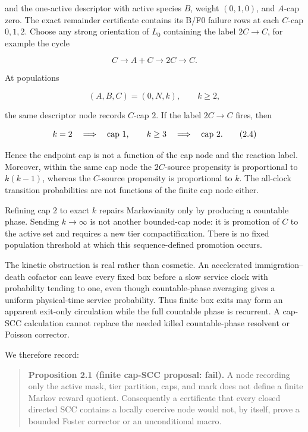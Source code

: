 and the one-active descriptor with active species \(B\), weight
\((0,1,0)\), and \(A\)-cap zero. The exact remainder certificate
contains its B/F0 failure rows at each \(C\)-cap \(0,1,2\). Choose any
strong orientation of \(L_0\) containing the label \(2C\to C\), for
example the cycle

\[
                         C\longrightarrow A+C
                          \longrightarrow2C\longrightarrow C.       \tag{2.2}
\]

At populations

\[
                         (A,B,C)=(0,N,k),\qquad k\ge2,                \tag{2.3}
\]

the same descriptor node records \(C\)-cap \(2\). If the label
\(2C\to C\) fires, then

\[
 k=2\quad\Longrightarrow\quad\hbox{cap }1,
 \qquad
 k\ge3\quad\Longrightarrow\quad\hbox{cap }2.         \tag{2.4}
\]

Hence the endpoint cap is not a function of the cap node and the
reaction label. Moreover, within the same cap node the \(2C\)-source
propensity is proportional to \(k(k-1)\), whereas the \(C\)-source
propensity is proportional to \(k\). The all-clock transition
probabilities are not functions of the finite cap node either.

Refining cap \(2\) to exact \(k\) repairs Markovianity only by producing
a countable phase. Sending \(k\to\infty\) is not another bounded-cap
node: it is promotion of \(C\) to the active set and requires a new tier
compactification. There is no fixed population threshold at which this
sequence-defined promotion occurs.

The kinetic obstruction is real rather than cosmetic. An accelerated
immigration--death cofactor can leave every fixed box before a slow
service clock with probability tending to one, even though
countable-phase averaging gives a uniform physical-time service
probability. Thus finite box exits may form an apparent exit-only
circulation while the full countable phase is recurrent. A cap-SCC
calculation cannot replace the needed killed countable-phase resolvent
or Poisson corrector.

We therefore record:

\begin{quote}
\textbf{Proposition 2.1 (finite cap-SCC proposal: fail).} A node
recording only the active mask, tier partition, caps, and mark does not
define a finite Markov reward quotient. Consequently a certificate that
every closed directed SCC contains a locally coercive node would not, by
itself, prove a bounded Foster corrector or an unconditional macro.
\end{quote}

